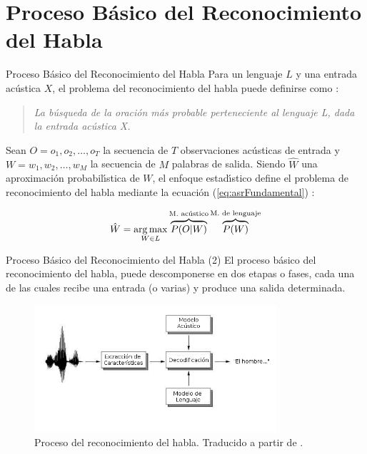 \section{Proceso B\'asico del Reconocimiento del Habla}

\begin{frame}{Proceso B\'asico del Reconocimiento del Habla}
Para un lenguaje $L$ y una entrada ac\'ustica $X$, el problema del reconocimiento del habla puede 
definirse como \cite{Jurafsky}:

\begin{quote}
\emph{La b\'usqueda de la oraci\'on m\'as probable perteneciente al lenguaje L, dada la entrada ac\'ustica X.}
\end{quote}

Sean $O = o_1,o_2,\ldots,o_T$ la secuencia de $T$ observaciones ac\'usticas de entrada y 
$W  = w_1,w_2,\ldots,w_M$ la secuencia de $M$ palabras de salida. Siendo $\hat{W}$ una aproximaci\'on 
probabil{\'\i}stica de $W$, el enfoque estad{\'\i}stico define el problema de reconocimiento del habla 
mediante la ecuaci\'on (\ref{eq:asrFundamental}) \cite{Jurafsky}:

\begin{align}
\hat{W} = \operatorname*{arg\,max}_{W \in L} \overbrace{P(O|W)}^\text{M. ac\'ustico}\overbrace{P(W)}^\text{M. de lenguaje}
\label{eq:asrFundamental}
\end{align}
\end{frame}

\begin{frame}{Proceso B\'asico del Reconocimiento del Habla (2)}
El proceso b\'asico del reconocimiento del habla, puede descomponerse en dos etapas o fases, 
cada una de las cuales recibe una entrada (o varias) y produce una salida determinada.

\begin{figure}[H] 
\centering
\includegraphics[width=0.8\textwidth]{./graphics/proceso.png}
\caption{Proceso del reconocimiento del habla. Traducido a partir de \protect\cite{VerenichASR}.}
\label{figure:proceso}
\end{figure}
\end{frame}

